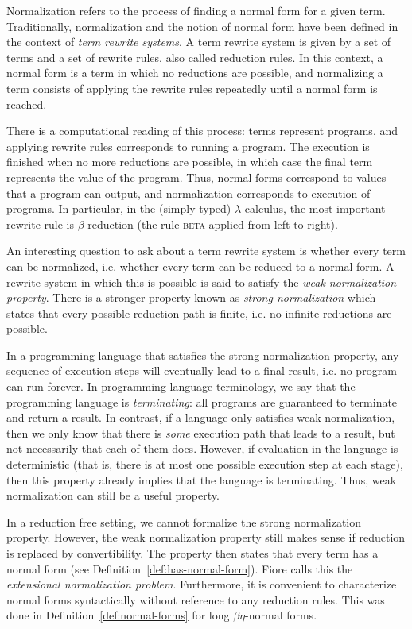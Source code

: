 Normalization refers to the process of finding a normal form for a given term. Traditionally, normalization and the notion of normal form have been defined in the context of \textit{term rewrite systems}. A term rewrite system is given by a set of terms and a set of rewrite rules, also called reduction rules. In this context, a normal form is a term in which no reductions are possible, and normalizing a term consists of applying the rewrite rules repeatedly until a normal form is reached.

There is a computational reading of this process: terms represent programs, and applying rewrite rules corresponds to running a program. The execution is finished when no more reductions are possible, in which case the final term represents the value of the program. Thus, normal forms correspond to values that a program can output, and normalization corresponds to execution of programs. In particular, in the (simply typed) $\lambda$-calculus, the most important rewrite rule is $\beta$-reduction (the rule \textsc{beta} applied from left to right).

An interesting question to ask about a term rewrite system is whether every term can be normalized, i.e. whether every term can be reduced to a normal form. A rewrite system in which this is possible is said to satisfy the \textit{weak normalization property}. There is a stronger property known as \textit{strong normalization} which states that every possible reduction path is finite, i.e. no infinite reductions are possible.

In a programming language that satisfies the strong normalization property, any sequence of execution steps will eventually lead to a final result, i.e. no program can run forever. In programming language terminology, we say that the programming language is \textit{terminating}: all programs are guaranteed to terminate and return a result. In contrast, if a language only satisfies weak normalization, then we only know that there is \textit{some} execution path that leads to a result, but not necessarily that each of them does. However, if evaluation in the language is deterministic (that is, there is at most one possible execution step at each stage), then this property already implies that the language is terminating. Thus, weak normalization can still be a useful property.

In a reduction free setting, we cannot formalize the strong normalization property. However, the weak normalization property still makes sense if reduction is replaced by convertibility. The property then states that every term has a normal form (see Definition~\ref{def:has-normal-form}). Fiore \cite{fiore:2002:ppdp, fiore:2022:mscs} calls this the \textit{extensional normalization problem}. Furthermore, it is convenient to characterize normal forms syntactically without reference to any reduction rules. This was done in Definition~\ref{def:normal-forms} for long $\beta\eta$-normal forms.

